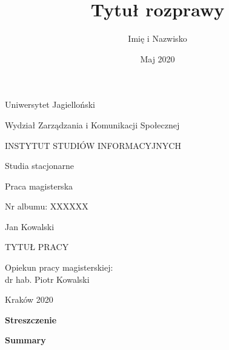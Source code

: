 \documentclass[twoside,a4paper,12pt]{report} %
\title{Tytuł rozprawy}
\author{Imię i Nazwisko }
\date{Maj 2020}
\theoremstyle{break}
\begin{document}
\titleformat{\chapter}[display] {\normalfont\Huge\bfseries}{\chaptertitlename\ \thechapter}{0pt}{\Huge}
\titlespacing{\chapter}{1cm}{2cm}{1cm}

\thispagestyle{empty}
\begin{center}{\sc \large
Uniwersytet Jagielloński\par\vspace{0.2cm}\par
Wydział Zarządzania i Komunikacji Społecznej}\par\vspace{0.3cm}\par
{\LARGE
INSTYTUT STUDIÓW INFORMACYJNYCH}\par\vspace{0.2cm}\par
{\large
Studia stacjonarne}\par\vspace{1cm}\par
{\Large
Praca magisterska}%
\end{center}
\vspace{1.5cm}
\begin{flushleft}
{\large
Nr albumu: XXXXXX}%
\end{flushleft}
\vspace{1.5cm}
\begin{center}
{\LARGE
Jan Kowalski%
}\par\vspace{0.9cm}\par
{\huge
TYTUŁ PRACY%
}
\end{center}
\vspace{4cm}
\begin{flushright}

Opiekun pracy magisterskiej:\\
dr hab. Piotr Kowalski%
\end{flushright}
\vfill
\begin{center}
Kraków 2020%
\end{center}


\leavevmode\thispagestyle{empty}\newpage
\centerline{\LARGE \bf Streszczenie}\par\vspace{1cm}\par
\lipsum[1]
\thispagestyle{empty} 
\newpage
\centerline{\LARGE \bf Summary}\par\vspace{1cm}\par
\lipsum[1]
\thispagestyle{empty} 
\newpage
\end{document}
